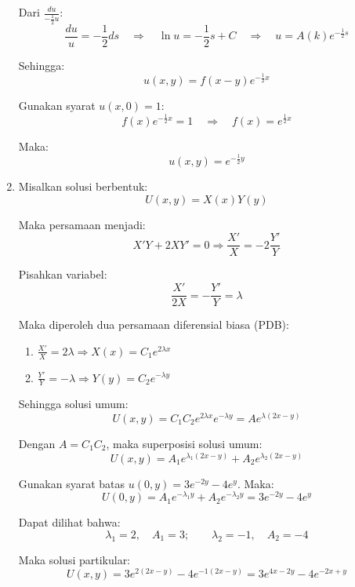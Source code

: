 \documentclass{article}
\theoremstyle{definition}
\begin{document}
\begin{enumerate}
  Dari \(\frac{du}{-\frac{1}{2}u}\):
  \[
  \frac{du}{u} = -\frac{1}{2}ds
  \quad \Rightarrow \quad
  \ln u = -\frac{1}{2}s + C
  \quad \Rightarrow \quad
  u = A(k)e^{-\frac{1}{2}s}
  \]
  
  Sehingga:
  \[
  u(x,y) = f(x-y)e^{-\frac{1}{2}x}
  \]
  
  Gunakan syarat \(u(x,0) = 1\):
  \[
  f(x)e^{-\frac{1}{2}x} = 1
  \quad \Rightarrow \quad
  f(x) = e^{\frac{1}{2}x}
  \]
  
  Maka:
  \[
  u(x,y) = e^{-\frac{1}{2}y}
  \]
  \item 
  
  Misalkan solusi berbentuk:
  \[
  U(x,y) = X(x)Y(y)
  \]
  
  Maka persamaan menjadi:
  \[
  X'Y + 2XY' = 0 \Rightarrow \frac{X'}{X} = -2\frac{Y'}{Y}
  \]
  
  Pisahkan variabel:
  \[
  \frac{X'}{2X} = -\frac{Y'}{Y} = \lambda
  \]
  
  Maka diperoleh dua persamaan diferensial biasa (PDB):
  
  \begin{enumerate}
      \item $\displaystyle \frac{X'}{X} = 2\lambda \Rightarrow X(x) = C_1 e^{2\lambda x}$
      \item $\displaystyle \frac{Y'}{Y} = -\lambda \Rightarrow Y(y) = C_2 e^{-\lambda y}$
  \end{enumerate}
  
  Sehingga solusi umum:
  \[
  U(x,y) = C_1C_2 e^{2\lambda x} e^{-\lambda y} = A e^{\lambda(2x - y)}
  \]
  
  Dengan $A = C_1C_2$, maka superposisi solusi umum:
  \[
  U(x,y) = A_1 e^{\lambda_1(2x - y)} + A_2 e^{\lambda_2(2x - y)}
  \]
  
  Gunakan syarat batas \( u(0,y) = 3e^{-2y} - 4e^y \). Maka:
  \[
  U(0,y) = A_1 e^{-\lambda_1 y} + A_2 e^{-\lambda_2 y} = 3e^{-2y} - 4e^{y}
  \]
  
  Dapat dilihat bahwa:
  \[
  \lambda_1 = 2, \quad A_1 = 3; \qquad \lambda_2 = -1, \quad A_2 = -4
  \]
  
  Maka solusi partikular:
  \[
  U(x,y) = 3e^{2(2x - y)} - 4e^{-1(2x - y)} = 3e^{4x - 2y} - 4e^{-2x + y}
  \]

\end{enumerate}
\end{document}
